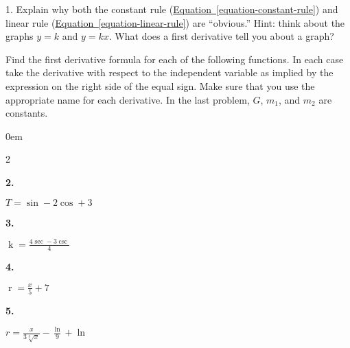 \documentclass[12pt,]{book}
\theoremstyle{plain}
\theoremstyle{definition}
\numberwithin{equation}{section}
\newenvironment{exercisegroup}%
{\medskip\noindent}%
{\par\bigskip}%
\newlength{\exercisegroupindent}%
\newlength{\exercisegroupitemwidth}%
\newenvironment{exercisegrouplist}%
{\vspace{-\partopsep}%
\begin{adjustwidth}{\exercisegroupindent}{0em}}%
{\end{adjustwidth}%
\vspace{-\partopsep}%
\vspace{\baselineskip}}%
\newenvironment{exercisegroupbycol}[1]%
{\begin{exercisegrouplist}%
\vspace{-\multicolsep}%
\begin{multicols}{#1}%
\setlength{\parindent}{0em}%
\setlength{\exercisegroupitemwidth}{\linewidth}}%
{\end{multicols}%
\vspace{-\multicolsep}%
\end{exercisegrouplist}}%
\newenvironment{exercisegroupitem}[1]%
{\begin{minipage}[t]{\exercisegroupitemwidth}
\vspace{0pt}%
{\bfseries#1}%
\rule{0pt}{\baselineskip}}{\strut%
\end{minipage}%
\hspace{\columnsep}}%
\providecommand\phantomsection{}
\newcommand{\fe}[2]{\mathop{{#1}{\left(#2\right)}}}
\begin{document}
\begin{exerciselist}
\item[1.]\phantomsection\hypertarget{exercise-302}{\null}Explain why both the constant rule (\hyperref[equation-constant-rule]{Equation~\ref*{equation-constant-rule}}) and linear rule (\hyperref[equation-linear-rule]{Equation~\ref*{equation-linear-rule}}) are ``obvious.'' Hint: think about the graphs \(y=k\) and \(y=kx\).  What does a first derivative tell you about a graph?%
\par\smallskip
\end{exerciselist}
\begin{exercisegroup}%
Find the first derivative formula for each of the following functions.  In each case take the derivative with respect to the independent variable as implied by the expression on the right side of the equal sign.  Make sure that you use the appropriate name for each derivative. In the last problem, \(G\), \(m_1\), and \(m_2\) are constants.%
\par
\begin{exercisegroupbycol}{2}%
\begin{exercisegroupitem}{2. }\phantomsection\hypertarget{exercise-303}{\null}
\(T=\fe{\sin}{t}-2\fe{\cos}{t}+3\)%
\end{exercisegroupitem}%
\par%
\begin{exercisegroupitem}{3. }\phantomsection\hypertarget{exercise-304}{\null}
\(\fe{k}{\theta}=\frac{4\fe{\sec}{\theta}-3\fe{\csc}{\theta}}{4}\)%
\end{exercisegroupitem}%
\par%
\begin{exercisegroupitem}{4. }\phantomsection\hypertarget{exercise-305}{\null}
\(\fe{r}{x}=\frac{x}{5}+7\)%
\end{exercisegroupitem}%
\par%
\begin{exercisegroupitem}{5. }\phantomsection\hypertarget{exercise-306}{\null}
\(r=\frac{x}{3\sqrt[3]{x}}-\frac{\fe{\ln}{x}}{9}+\fe{\ln}{2}\)%
\end{exercisegroupitem}%
\par%
\end{exercisegroupbycol}%
\end{exercisegroup}%
\typeout{************************************************}
\typeout{************************************************}
\end{document}
